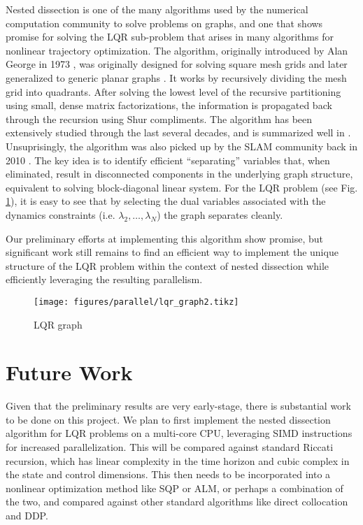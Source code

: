 \documentclass[../root.tex]{subfiles}
\begin{document}
Nested dissection is one of the many algorithms used by the numerical
computation community to solve problems on graphs, and one that shows promise
for solving the LQR sub-problem that arises in many algorithms for nonlinear
trajectory optimization. The algorithm, originally introduced by Alan George
in 1973 \cite{george_Nested_1973}, was originally designed for solving square
mesh grids and later generalized to generic planar graphs
\cite{lipton_Generalized_1979}. It works by recursively dividing the mesh grid
into quadrants. After solving the lowest level of the recursive partitioning
using small, dense matrix factorizations, the information is propagated back
through the recursion using Shur compliments. The algorithm has been
extensively studied through the last several decades, and is summarized well
in \cite{khaira_Nested_}. Unsuprisingly, the algorithm was also picked up by
the SLAM community back in 2010 \cite{ni_Multilevel_2010}. The key idea is to
identify efficient ``separating'' variables that, when eliminated, result in
disconnected components in the underlying graph structure, equivalent to
solving block-diagonal linear system. For the LQR problem (see Fig.
\ref{fig:LQR_graph}), it is easy to see that by selecting the dual variables
associated with the dynamics constraints (i.e. $\lambda_2, \dots, \lambda_N$) the
graph separates cleanly.

Our preliminary efforts at implementing this algorithm show promise, but significant work
still remains to find an efficient way to implement the unique structure of the LQR problem
within the context of nested dissection while efficiently leveraging the resulting 
parallelism. 

\begin{figure}
    \centering
    \texttt{[image: figures/parallel/lqr\_graph2.tikz]}
    \caption{LQR graph}
    \label{fig:LQR_graph}
\end{figure}

\section{Future Work}

Given that the preliminary results are very early-stage, there is substantial work to 
be done on this project. We plan to first implement the nested dissection algorithm for 
LQR problems on a multi-core CPU, leveraging SIMD instructions for increased parallelization.
This will be compared against standard Riccati recursion, which has linear complexity 
in the time horizon and cubic complex in the state and control dimensions. This then 
needs to be incorporated into a nonlinear optimization method like SQP or ALM, or perhaps
a combination of the two, and compared against other standard algorithms like direct 
collocation and DDP.
\end{document}
